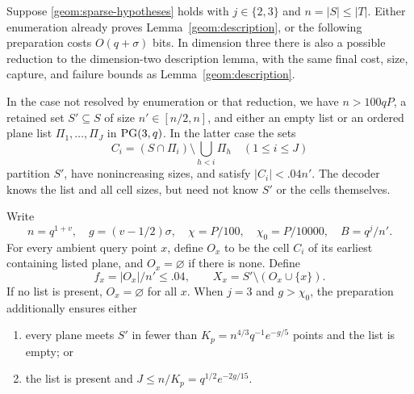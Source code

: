 \begin{proposition}\label{geom:preparation}
Suppose \eqref{geom:sparse-hypotheses} holds with $j\in\{2,3\}$ and
$n=|S|\leq|T|$. Either enumeration already proves
Lemma~\ref{geom:description}, or the following preparation costs
$O(q+\sigma)$ bits. In dimension three there is also a possible
reduction to the dimension-two description lemma, with the same final
cost, size, capture, and failure bounds as
Lemma~\ref{geom:description}.

In the case not resolved by enumeration or that reduction, we have
$n>100qP$, a retained set $S'\subseteq S$ of size
$n'\in[n/2,n]$, and either an empty list or an ordered plane list
$\Pi_1,\ldots,\Pi_J$ in $\operatorname{PG}(3,q)$. In the latter case the sets
\begin{equation}\label{geom:cells}
 C_i=(S\cap\Pi_i)\setminus\bigcup_{h<i}\Pi_h
 \quad(1\leq i\leq J)
\end{equation}
partition $S'$, have nonincreasing sizes, and satisfy
$|C_i|<.04n'$. The decoder knows the list and all cell sizes, but need
not know $S'$ or the cells themselves.

Write
\begin{equation}\label{geom:lowdim-parameters}
 n=q^{1+v},\quad g=(v-1/2)\sigma,\quad
 \chi=P/100,\quad\chi_0=P/10000,\quad B=q^j/n'.
\end{equation}
For every ambient query point $x$, define $O_x$ to be the cell $C_i$
of its earliest containing listed plane, and $O_x=\varnothing$ if
there is none. Define
\begin{equation}\label{geom:outside-support}
 f_x=|O_x|/n'\leq .04,\qquad
 X_x=S'\setminus(O_x\cup\{x\}).
\end{equation}
If no list is present, $O_x=\varnothing$ for all $x$. When
$j=3$ and $g>\chi_0$, the preparation additionally ensures either
\begin{enumerate}[label=(\roman*)]
 \item every plane meets $S'$ in fewer than
 $K_p=n^{4/3}q^{-1}e^{-g/5}$ points and the list is empty; or
 \item the list is present and
 $J\leq n/K_p=q^{1/2}e^{-2g/15}$.
\end{enumerate}
\end{proposition}

